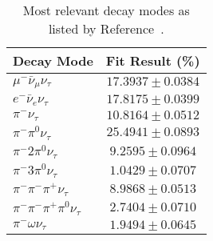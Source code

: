 \begin{table}[h]
\centering
\begin{tabular}{l|c}
\toprule
Decay Mode & Fit Result (\%) \\
\midrule
$\mu^-   \bar{\nu}_{\mu}\nu_{\tau}$ & $17.3937 \pm 0.0384$ \\
$e^-   \bar{\nu}_{e}\nu_{\tau}$ & $17.8175 \pm 0.0399$ \\
$\pi^-   \nu_{\tau}$ & $10.8164 \pm 0.0512$ \\
$\pi^-\pi^0   \nu_{\tau}$ & $25.4941 \pm 0.0893$ \\
$\pi^-2\pi^0   \nu_{\tau}$  & $9.2595 \pm 0.0964$ \\
$\pi^-3\pi^0   \nu_{\tau}$ & $1.0429 \pm 0.0707$ \\
$\pi^- \pi^-\pi^+\nu_{\tau}$ & $8.9868 \pm 0.0513$\\
$\pi^- \pi^-\pi^+\pi^0\nu_{\tau}$ & $2.7404 \pm 0.0710$\\
$\pi^- \omega\nu_{\tau}$ & $1.9494 \pm 0.0645$ \\
\bottomrule
\end{tabular}
\caption{Most relevant \Ptau decay modes as listed by Reference~\cite{Workman:2022ynf}.}%
\label{tab:Chap3:Reco:Tau:DecayModes}
\end{table}



